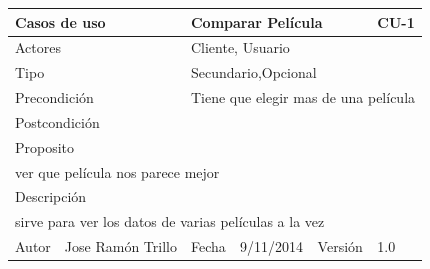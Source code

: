 \documentclass{article}
\begin{document}
\begin{table}[h]
\begin{tabular}{|l|l|l|l|l|l|}
\hline
\multicolumn{2}{|p{2cm}|}{Casos de uso}  & \multicolumn{3}{p{7cm}|}{\textbf{Comparar Película}} & CU-1 \\
\hline
\multicolumn{2}{|p{2cm}|}{Actores}       & \multicolumn{4}{p{8cm}|}{Cliente, Usuario}        \\
\hline
\multicolumn{2}{|p{2cm}|}{Tipo}          & \multicolumn{4}{p{8cm}|}{Secundario,Opcional}        \\
\hline
\multicolumn{2}{|p{2cm}|}{Precondición}  & \multicolumn{4}{p{8cm}|}{Tiene que elegir mas de una película}        \\
\hline
\multicolumn{2}{|p{2cm}|}{Postcondición} & \multicolumn{4}{p{8cm}|}{}        \\
\hline
\multicolumn{6}{|p{10cm}|}{Proposito}                                   \\
\hline
\multicolumn{6}{|p{10cm}|}{ver que película nos parece mejor}                                            \\
\hline
\multicolumn{6}{|p{10cm}|}{Descripción}                                 \\
\hline
\multicolumn{6}{|p{10cm}|}{sirve para ver los datos de varias películas a la vez}                                            \\
\hline
Autor              &      Jose Ramón Trillo        & Fecha   & 9/11/2014     &   Versión  &1.0\\
\hline
\end{tabular}
\end{table}
\end{document}
